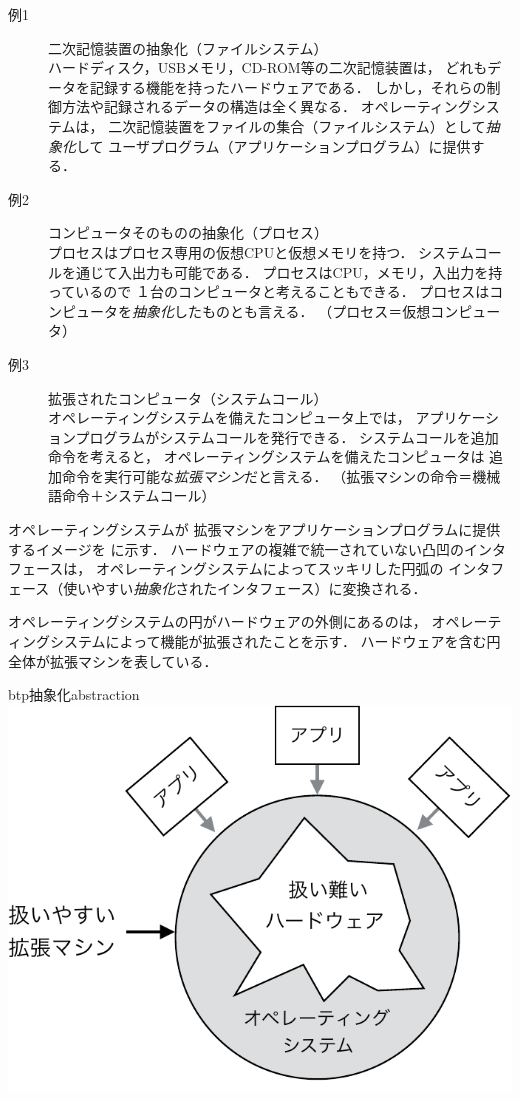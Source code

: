 \begin{description}
\item[例1] 二次記憶装置の抽象化（ファイルシステム） \\
  ハードディスク，USBメモリ，CD-ROM等の二次記憶装置は，
  どれもデータを記録する機能を持ったハードウェアである．
  しかし，それらの制御方法や記録されるデータの構造は全く異なる．
  オペレーティングシステムは，
  二次記憶装置をファイルの集合（ファイルシステム）として\emph{抽象化}して
  ユーザプログラム（アプリケーションプログラム）に提供する．

\item[例2] コンピュータそのものの抽象化（プロセス） \\
  プロセスはプロセス専用の仮想CPUと仮想メモリを持つ．
  システムコールを通じて入出力も可能である．
  プロセスはCPU，メモリ，入出力を持っているので
  １台のコンピュータと考えることもできる．
  プロセスはコンピュータを\emph{抽象化}したものとも言える．
  （プロセス＝仮想コンピュータ）

\item[例3] 拡張されたコンピュータ（システムコール） \\
  オペレーティングシステムを備えたコンピュータ上では，
  アプリケーションプログラムがシステムコールを発行できる．
  システムコールを追加命令を考えると，
  オペレーティングシステムを備えたコンピュータは
  追加命令を実行可能な\emph{拡張マシン}だと言える．
  （拡張マシンの命令＝機械語命令＋システムコール）
\end{description}

オペレーティングシステムが
拡張マシンをアプリケーションプログラムに提供するイメージを
に示す．
ハードウェアの複雑で統一されていない凸凹のインタフェースは，
オペレーティングシステムによってスッキリした円弧の
インタフェース（使いやすい\emph{抽象化}されたインタフェース）に変換される．

オペレーティングシステムの円がハードウェアの外側にあるのは，
オペレーティングシステムによって機能が拡張されたことを示す．
ハードウェアを含む円全体が拡張マシンを表している．

\begin{myfig}{btp}{抽象化}{abstraction}
  \includegraphics[scale=0.75]{Fig/abstraction-crop.pdf}
\end{myfig}

